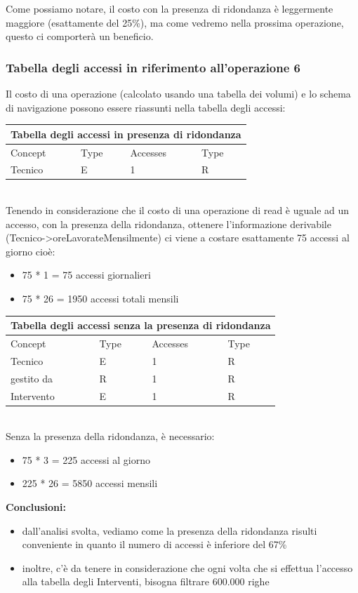 \documentclass[legalpaper]{article}
\begin{document}
	Come possiamo notare, il costo con la presenza di ridondanza è leggermente maggiore (esattamente del 25\%), ma come vedremo nella prossima operazione, questo ci comporterà un beneficio.
\newpage
	\subsubsection{Tabella degli accessi in riferimento all'operazione 6}
	Il costo di una operazione (calcolato usando una tabella dei volumi) e lo schema di navigazione possono essere riassunti nella tabella degli accessi: \\ 
	\newline
	\medskip
	\renewcommand\arraystretch{1,5}
	\begin{tabular}{|p{4cm}|p{4cm}|p{4cm}|p{4cm}|}
		\hline
		\multicolumn{4}{|c|}{\textbf{Tabella degli accessi in presenza di ridondanza}}\\
		\hline
		Concept & Type & Accesses & Type \\
		\hline
		Tecnico & E & 1 & R \\
		\hline
	\end{tabular}\\
	\newline
	Tenendo in considerazione che il costo di una operazione di read è uguale ad un accesso, con la presenza della ridondanza, ottenere l'informazione derivabile (Tecnico->oreLavorateMensilmente) ci viene a costare esattamente 75 accessi al giorno cioè:
	\begin{itemize}
		\item 75 * 1 = 75 accessi giornalieri
		\item 75 * 26 = 1950 accessi totali mensili
	\end{itemize}
	\begin{tabular}{|p{4cm}|p{4cm}|p{4cm}|p{4cm}|}
		\hline
		\multicolumn{4}{|c|}{\textbf{Tabella degli accessi senza la presenza di ridondanza}}\\
		\hline
		Concept & Type & Accesses & Type \\
		\hline
		Tecnico & E & 1 & R \\
		\hline
		gestito da & R & 1 & R \\ 
		\hline
		Intervento & E & 1 & R \\
		\hline
	\end{tabular} \\
	\newline
	Senza la presenza della ridondanza, è necessario:
	\begin{itemize}
		\item 75 * 3 = 225 accessi al giorno
		\item 225 * 26 = 5850 accessi mensili
	\end{itemize}
	\textbf{Conclusioni:}
	\begin{itemize}
		\item dall'analisi svolta, vediamo come la presenza della ridondanza risulti conveniente in quanto il numero di accessi è inferiore del 67\%
		\item inoltre, c'è da tenere in considerazione che ogni volta che si effettua l'accesso alla tabella degli Interventi, bisogna filtrare 600.000 righe
	\end{itemize}
	
\end{document}
